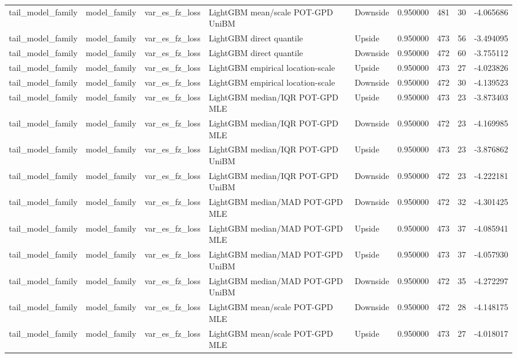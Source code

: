 \begin{tabular}{lllllrrr}
tail\_model\_family & model\_family & var\_es\_fz\_loss & LightGBM mean/scale POT-GPD UniBM & Downside & 0.950000 & 481 & 30 & -4.065686 \\
tail\_model\_family & model\_family & var\_es\_fz\_loss & LightGBM direct quantile & Upside & 0.950000 & 473 & 56 & -3.494095 \\
tail\_model\_family & model\_family & var\_es\_fz\_loss & LightGBM direct quantile & Downside & 0.950000 & 472 & 60 & -3.755112 \\
tail\_model\_family & model\_family & var\_es\_fz\_loss & LightGBM empirical location-scale & Upside & 0.950000 & 473 & 27 & -4.023826 \\
tail\_model\_family & model\_family & var\_es\_fz\_loss & LightGBM empirical location-scale & Downside & 0.950000 & 472 & 30 & -4.139523 \\
tail\_model\_family & model\_family & var\_es\_fz\_loss & LightGBM median/IQR POT-GPD MLE & Upside & 0.950000 & 473 & 23 & -3.873403 \\
tail\_model\_family & model\_family & var\_es\_fz\_loss & LightGBM median/IQR POT-GPD MLE & Downside & 0.950000 & 472 & 23 & -4.169985 \\
tail\_model\_family & model\_family & var\_es\_fz\_loss & LightGBM median/IQR POT-GPD UniBM & Upside & 0.950000 & 473 & 23 & -3.876862 \\
tail\_model\_family & model\_family & var\_es\_fz\_loss & LightGBM median/IQR POT-GPD UniBM & Downside & 0.950000 & 472 & 23 & -4.222181 \\
tail\_model\_family & model\_family & var\_es\_fz\_loss & LightGBM median/MAD POT-GPD MLE & Downside & 0.950000 & 472 & 32 & -4.301425 \\
tail\_model\_family & model\_family & var\_es\_fz\_loss & LightGBM median/MAD POT-GPD MLE & Upside & 0.950000 & 473 & 37 & -4.085941 \\
tail\_model\_family & model\_family & var\_es\_fz\_loss & LightGBM median/MAD POT-GPD UniBM & Upside & 0.950000 & 473 & 37 & -4.057930 \\
tail\_model\_family & model\_family & var\_es\_fz\_loss & LightGBM median/MAD POT-GPD UniBM & Downside & 0.950000 & 472 & 35 & -4.272297 \\
tail\_model\_family & model\_family & var\_es\_fz\_loss & LightGBM mean/scale POT-GPD MLE & Downside & 0.950000 & 472 & 28 & -4.148175 \\
tail\_model\_family & model\_family & var\_es\_fz\_loss & LightGBM mean/scale POT-GPD MLE & Upside & 0.950000 & 473 & 27 & -4.018017 \\

\end{tabular}
